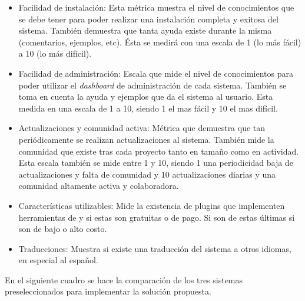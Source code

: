 \begin{itemize}

    \item Facilidad de instalación:
        Esta métrica muestra el nivel de conocimientos que se debe
        tener para poder realizar una instalación completa y exitosa del sistema.
        También demuestra que tanta ayuda existe durante la misma (comentarios,
        ejemplos, etc).
        Ésta se medirá con una escala de 1 (lo más fácil) a 10 (lo más difícil).

    \item Facilidad de administración:
        Escala que mide el nivel de conocimientos para poder utilizar el
        \emph{dashboard} de administración de cada sistema.
        También se toma en cuenta la ayuda y ejemplos que da el sistema al usuario.
        Esta medida en una escala de 1 a 10, siendo 1 el mas fácil y 10 el mas
        difícil.

    \item Actualizaciones y comunidad activa:
        Métrica que demuestra que tan periódicamente se realizan actualizaciones
        al sistema.
        También mide la comunidad que existe tras cada proyecto tanto en tamaño
        como en actividad.
        Esta escala también se mide entre 1 y 10, siendo 1 una periodicidad baja
        de actualizaciones y falta de comunidad y 10 actualizaciones diarias y
        una comunidad altamente activa y colaboradora.

    \item Características utilizables:
        Mide la existencia de plugins que implementen herramientas de {\GAM}
        y si estas son gratuitas o de pago.
        Si son de estas últimas si son de bajo o alto costo.

    \item Traducciones:
        Muestra si existe una traducción del sistema a otros idiomas, en especial
        al español.

\end{itemize}

En el siguiente cuadro se hace la comparación de los tres sistemas preseleccionados
para implementar la solución propuesta.

